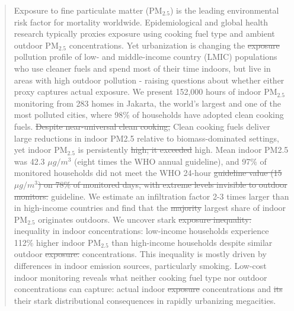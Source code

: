 \documentclass[9pt,twocolumn,twoside]{pnas-new}
\providecommand{\DIFadd}[1]{{\protect\color{red}#1}}
\providecommand{\DIFdel}[1]{{\protect\color{red}\protect\sout{#1}}}
\begin{document}
\begin{abstract}
Exposure to fine particulate matter (PM$_{2.5}$) is the leading environmental risk factor for mortality worldwide. Epidemiological and global health research typically proxies exposure using cooking fuel type and ambient outdoor PM$_{2.5}$ concentrations. Yet urbanization is changing the \DIFdel{exposure} \DIFadd{pollution} profile of low- and middle-income country (LMIC) populations who use cleaner fuels and spend most of their time indoors, but live in areas with high outdoor pollution - raising questions about whether either proxy captures actual exposure.
We present 152,000 hours of indoor PM$_{2.5}$ monitoring from 283 homes in Jakarta, the world's largest and one of the most polluted cities, where 98\% of households have adopted clean cooking fuels.
\DIFdel{Despite near-universal clean cooking,}
\DIFadd{Clean cooking fuels deliver large reductions in indoor PM2.5 relative to biomass-dominated settings, yet} indoor PM$_{2.5}$ is persistently \DIFdel{high; it exceeded} \DIFadd{high. Mean indoor PM2.5 was 42.3 $\mu g/m^3$ (eight times the WHO annual guideline), and 97\% of monitored households did not meet} the WHO 24-hour \DIFdel{guideline value (15 $\mu g/m^3$) on 78\% of monitored days, with extreme levels invisible to outdoor monitors.} \DIFadd{guideline.} We estimate an infiltration factor 2-3 times larger than in high-income countries and find that the \DIFdel{majority} \DIFadd{largest share} of indoor PM$_{2.5}$ originates outdoors. We uncover stark \DIFdel{exposure inequality:} \DIFadd{inequality in indoor concentrations:} low-income households experience 112\% higher indoor PM$_{2.5}$ than high-income households despite similar outdoor \DIFdel{exposure.} \DIFadd{concentrations.} This inequality is mostly driven by differences in indoor emission sources, particularly smoking.
Low-cost indoor monitoring reveals what neither cooking fuel type nor outdoor concentrations can capture: actual indoor \DIFdel{exposure} \DIFadd{concentrations} and \DIFdel{its} \DIFadd{their} stark distributional consequences in rapidly urbanizing megacities. 
\end{abstract}

\maketitle
\thispagestyle{firststyle}

\end{document}
